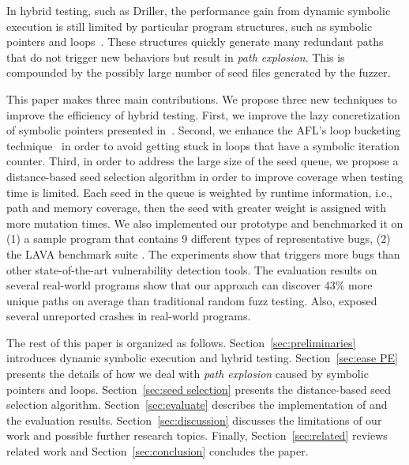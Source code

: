 In hybrid testing, such as Driller, the performance gain from dynamic
symbolic execution is still limited by particular program
structures, such as symbolic pointers and loops~\cite{schwartz2010all,
Boonstoppel:RAP, cadar2011symbolic, baldoni2016survey}. These structures
quickly generate many redundant paths that do not trigger new behaviors
but result in \textit{path explosion}. This is compounded by the possibly
large number of seed files generated by the fuzzer.

This paper makes three main contributions. We propose three new
techniques to improve the efficiency of hybrid testing. First, we
improve the lazy concretization of symbolic pointers presented
in~\cite{chipounov2011s2e}. Second, we enhance the AFL's loop bucketing
technique~\cite{online:afl} in order to avoid getting stuck in loops
that have a symbolic iteration counter. Third, in order to address the
large size of the seed queue, we propose a distance-based seed
selection algorithm in order to improve coverage when testing time is
limited. Each seed in the queue is weighted by runtime information, i.e.,
path and memory coverage, then the seed with greater weight is assigned with
more mutation times. We also 
implemented our prototype \prototype and benchmarked it on 
(1) a sample program that contains 9
different types of representative bugs, (2) the LAVA benchmark suite
\cite{dolan2016lava}. 
The experiments show that \prototype triggers more bugs
than other state-of-the-art vulnerability detection tools. 
The evaluation results on several real-world programs show that our approach can
discover 43\% more unique paths on average than traditional random fuzz
testing. Also, \prototype exposed several unreported crashes in real-world programs. 

The rest of this paper is organized as follows.
Section~\ref{sec:preliminaries} introduces dynamic symbolic execution
and hybrid testing. Section~\ref{sec:ease PE} presents the details of
how we deal with \textit{path explosion} caused by symbolic pointers
and loops. Section~\ref{sec:seed selection} presents the distance-based
seed selection algorithm. Section~\ref{sec:evaluate} describes the
implementation of \prototype and the evaluation results.
Section~\ref{sec:discussion} discusses the limitations of our work and
possible further research topics. Finally, Section~\ref{sec:related} reviews
related work and Section~\ref{sec:conclusion} concludes the paper.

